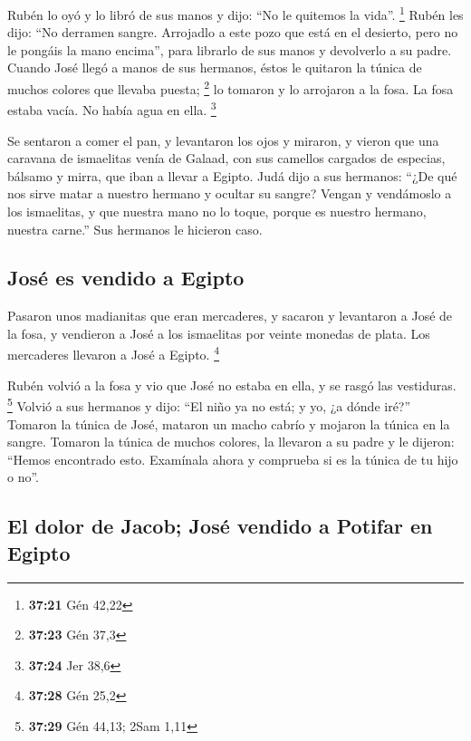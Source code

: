 \begin{paracol}{2}
 Rubén lo oyó y lo libró de sus manos y dijo: ``No le
quitemos la vida''. \footnote{\textbf{37:21} Gén 42,22} 
Rubén les dijo: ``No derramen sangre. Arrojadlo a este pozo que está en
el desierto, pero no le pongáis la mano encima'', para librarlo de sus
manos y devolverlo a su padre.  Cuando José llegó a manos
de sus hermanos, éstos le quitaron la túnica de muchos colores que
llevaba puesta; \footnote{\textbf{37:23} Gén 37,3}  lo
tomaron y lo arrojaron a la fosa. La fosa estaba vacía. No había agua en
ella. \footnote{\textbf{37:24} Jer 38,6}

 Se sentaron a comer el pan, y levantaron los ojos y
miraron, y vieron que una caravana de ismaelitas venía de Galaad, con
sus camellos cargados de especias, bálsamo y mirra, que iban a llevar a
Egipto.  Judá dijo a sus hermanos: ``¿De qué nos sirve
matar a nuestro hermano y ocultar su sangre?  Vengan y
vendámoslo a los ismaelitas, y que nuestra mano no lo toque, porque es
nuestro hermano, nuestra carne.'' Sus hermanos le hicieron caso.

\hypertarget{josuxe9-es-vendido-a-egipto}{%
\subsection{José es vendido a
Egipto}\label{josuxe9-es-vendido-a-egipto}}

 Pasaron unos madianitas que eran mercaderes, y sacaron y
levantaron a José de la fosa, y vendieron a José a los ismaelitas por
veinte monedas de plata. Los mercaderes llevaron a José a Egipto.
\footnote{\textbf{37:28} Gén 25,2}

 Rubén volvió a la fosa y vio que José no estaba en ella,
y se rasgó las vestiduras. \footnote{\textbf{37:29} Gén 44,13; 2Sam 1,11}
 Volvió a sus hermanos y dijo: ``El niño ya no está; y
yo, ¿a dónde iré?''  Tomaron la túnica de José, mataron
un macho cabrío y mojaron la túnica en la sangre. 
Tomaron la túnica de muchos colores, la llevaron a su padre y le
dijeron: ``Hemos encontrado esto. Examínala ahora y comprueba si es la
túnica de tu hijo o no''.

\hypertarget{el-dolor-de-jacob-josuxe9-vendido-a-potifar-en-egipto}{%
\subsection{El dolor de Jacob; José vendido a Potifar en
Egipto}\label{el-dolor-de-jacob-josuxe9-vendido-a-potifar-en-egipto}}


\end{paracol}
